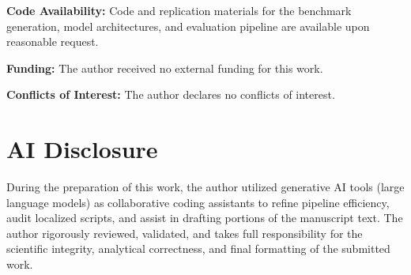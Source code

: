 \documentclass[10pt, conference]{IEEEtran}
\begin{document}
\textbf{Code Availability:} Code and replication materials for the benchmark generation, model architectures, and evaluation pipeline are available upon reasonable request. 

\textbf{Funding:} The author received no external funding for this work.

\textbf{Conflicts of Interest:} The author declares no conflicts of interest.

\vspace{-0.5em}
\section*{AI Disclosure}
During the preparation of this work, the author utilized generative AI tools (large language models) as collaborative coding assistants to refine pipeline efficiency, audit localized scripts, and assist in drafting portions of the manuscript text. The author rigorously reviewed, validated, and takes full responsibility for the scientific integrity, analytical correctness, and final formatting of the submitted work.



\end{document}
